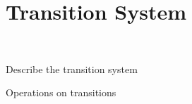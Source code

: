 \section{Transition System}~\label{sec:trans}

Describe the transition system

Operations on transitions

